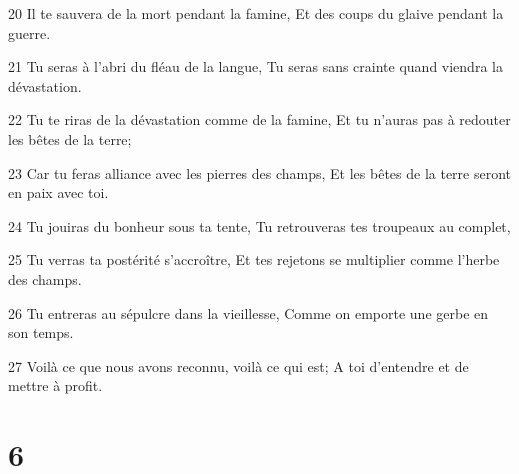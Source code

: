 \par 20 Il te sauvera de la mort pendant la famine, Et des coups du glaive pendant la guerre.
\par 21 Tu seras à l'abri du fléau de la langue, Tu seras sans crainte quand viendra la dévastation.
\par 22 Tu te riras de la dévastation comme de la famine, Et tu n'auras pas à redouter les bêtes de la terre;
\par 23 Car tu feras alliance avec les pierres des champs, Et les bêtes de la terre seront en paix avec toi.
\par 24 Tu jouiras du bonheur sous ta tente, Tu retrouveras tes troupeaux au complet,
\par 25 Tu verras ta postérité s'accroître, Et tes rejetons se multiplier comme l'herbe des champs.
\par 26 Tu entreras au sépulcre dans la vieillesse, Comme on emporte une gerbe en son temps.
\par 27 Voilà ce que nous avons reconnu, voilà ce qui est; A toi d'entendre et de mettre à profit.

\chapter{6}

